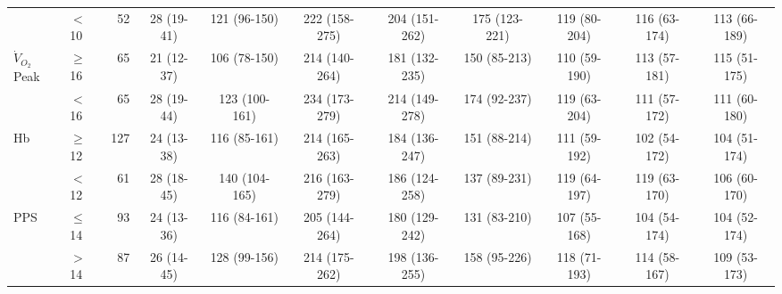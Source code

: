 \begin{sidewaystable}[p]
\begin{tabular}{|llr | cccccccc|}
		                    & $<$10     &  52 & 28 (19-41) & 121 (96-150)  & 222 (158-275) & 204 (151-262) & 175 (123-221) & 119 (80-204)  & 116 (63-174) & 113 (66-189)  \\
		$\dot{V}_{O_2}$Peak & $\geq$16 &  65 & 21 (12-37) & 106 (78-150)  & 214 (140-264) & 181 (132-235) & 150 (85-213)  & 110 (59-190)  & 113 (57-181) & 115 (51-175)  \\
		                    & $<$16     &  65 & 28 (19-44) & 123 (100-161) & 234 (173-279) & 214 (149-278) & 174 (92-237)  & 119 (63-204)  & 111 (57-172) & 111 (60-180)  \\
		Hb                  & $\geq$12  & 127 & 24 (13-38) & 116 (85-161)  & 214 (165-263) & 184 (136-247) & 151 (88-214)  & 111 (59-192)  & 102 (54-172) & 104 (51-174)  \\
		                    & $<$12     &  61 & 28 (18-45) & 140 (104-165) & 216 (163-279) & 186 (124-258) & 137 (89-231)  & 119 (64-197)  & 119 (63-170) & 106 (60-170)  \\
		PPS                 & $\leq$14  &  93 & 24 (13-36) & 116 (84-161)  & 205 (144-264) & 180 (129-242) & 131 (83-210)  & 107 (55-168)  & 104 (54-174) & 104 (52-174)  \\
		                    & $>$14     &  87 & 26 (14-45) & 128 (99-156)  & 214 (175-262) & 198 (136-255) & 158 (95-226)  & 118 (71-193)  & 114 (58-167) & 109 (53-173)  \\ \hline
	\end{tabular}	
\end{sidewaystable}































